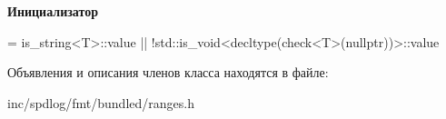 {\bfseries Инициализатор}
\begin{DoxyCode}
=
      is\_string<T>::value || !std::is\_void<decltype(check<T>(\textcolor{keyword}{nullptr}))>::value
\end{DoxyCode}


Объявления и описания членов класса находятся в файле\+:\begin{DoxyCompactItemize}
\item 
inc/spdlog/fmt/bundled/ranges.\+h\end{DoxyCompactItemize}
